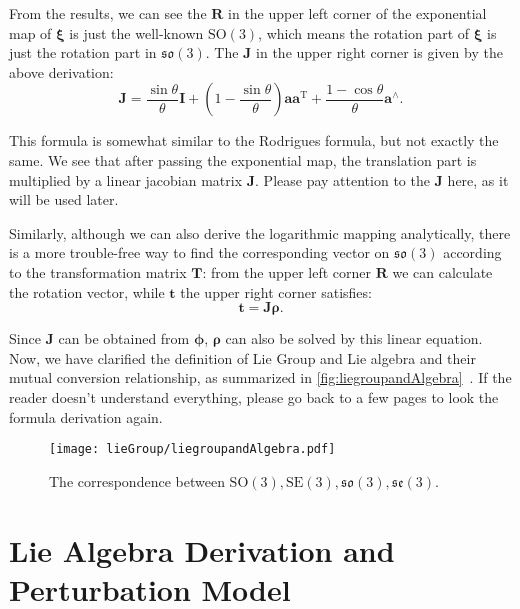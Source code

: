 From the results, we can see the $\mathbf{R}$ in the upper left corner of the exponential map of $\boldsymbol{\xi}$ is just the well-known $\mathrm{SO}(3)$, which means the rotation part of $\boldsymbol{\xi}$ is just the rotation part in $\mathfrak{so}(3)$. The $\mathbf{J}$ in the upper right corner is given by the above derivation:
\begin{equation}
\label{eq:lieAlgebraJacobian}
\mathbf{J} = \frac{{\sin \theta }}{\theta } \mathbf{I} + \left( {1 - \frac{{\sin \theta }}{\theta }} \right) \mathbf{a} { \mathbf{a}^\mathrm{T}} + \frac{{1 - \cos \theta }}{\theta }{ \mathbf{a}^ \wedge }.
\end{equation}

This formula is somewhat similar to the Rodrigues formula, but not exactly the same. We see that after passing the exponential map, the translation part is multiplied by a linear jacobian matrix $\mathbf{J}$. Please pay attention to the $\mathbf{J}$ here, as it will be used later.

Similarly, although we can also derive the logarithmic mapping analytically, there is a more trouble-free way to find the corresponding vector on $\mathfrak{so}(3)$ according to the transformation matrix $\mathbf{T}$: from the upper left corner $\mathbf{R}$ we can calculate the rotation vector, while $\mathbf{t}$ the upper right corner satisfies:
\begin{equation}
\mathbf{t} = \mathbf{J} \boldsymbol{\rho}.
\end{equation}

Since $\mathbf{J}$ can be obtained from $\boldsymbol{\phi}$, $\boldsymbol{\rho}$ can also be solved by this linear equation. Now, we have clarified the definition of Lie Group and Lie algebra and their mutual conversion relationship, as summarized in \autoref{fig:liegroupandAlgebra}~. If the reader doesn't understand everything, please go back to a few pages to look the formula derivation again.

\begin{figure}[!ht]
    \centering
    \texttt{[image: lieGroup/liegroupandAlgebra.pdf]}
    \caption{The correspondence between $\mathrm{SO}(3), \mathrm{SE}(3), \mathfrak{so}(3), \mathfrak{se}(3)$. }
    \label{fig:liegroupandAlgebra}
\end{figure}

\section{Lie Algebra Derivation and Perturbation Model}
